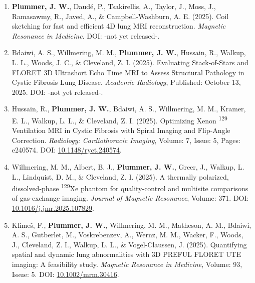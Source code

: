\documentclass[12pt,]{scrartcl}
\begin{document}
\begin{enumerate}
  \leftskip-0.13in %


    \item \textbf{Plummer, J. W.}, Daudé, P., Tsakirellis, A., Taylor, J., Moss, J., Ramasawmy, R., Javed, A., \& Campbell-Washburn, A. E. (2025). Coil sketching for fast and efficient 4D lung MRI reconstruction. \textit{Magnetic Resonance in Medicine}. DOI: -not yet released-.

    \item Bdaiwi, A. S., Willmering, M. M., \textbf{Plummer, J. W.}, Hussain, R., Walkup, L. L., Woods, J. C., \& Cleveland, Z. I. (2025). Evaluating Stack-of-Stars and FLORET 3D Ultrashort Echo Time MRI to Assess Structural Pathology in Cystic Fibrosis Lung Disease. \textit{Academic Radiology}, Published: October 13, 2025. DOI: -not yet released-.

    \item Hussain, R., \textbf{Plummer, J. W.}, Bdaiwi, A. S., Willmering, M. M., Kramer, E. L., Walkup, L. L., \& Cleveland, Z. I. (2025). Optimizing Xenon \textsuperscript{129} Ventilation MRI in Cystic Fibrosis with Spiral Imaging and Flip-Angle Correction. \textit{Radiology: Cardiothoracic Imaging}, Volume: 7, Issue: 5, Pages: e240574. DOI: \href{https://doi.org/10.1148/ryct.240574}{10.1148/ryct.240574}.



    \item Willmering, M. M., Albert, B. J., \textbf{Plummer, J. W.}, Greer, J., Walkup, L. L., Lindquist, D. M., \& Cleveland, Z. I. (2025). A thermally polarized, dissolved-phase \textsuperscript{129}Xe phantom for quality-control and multisite comparisons of gas-exchange imaging. \textit{Journal of Magnetic Resonance}, Volume: 371. DOI: \href{https://doi.org/10.1016/j.jmr.2025.107829}{10.1016/j.jmr.2025.107829}.

    \item Klimeš, F., \textbf{Plummer, J. W.}, Willmering, M. M., Matheson, A. M., Bdaiwi, A. S., Gutberlet, M., Voskrebenzev, A., Wernz, M. M., Wacker, F., Woods, J., Cleveland, Z. I., Walkup, L. L., \& Vogel-Claussen, J. (2025). Quantifying spatial and dynamic lung abnormalities with 3D PREFUL FLORET UTE imaging: A feasibility study. \textit{Magnetic Resonance in Medicine}, Volume: 93, Issue: 5. DOI: \href{https://doi.org/10.1002/mrm.30416}{10.1002/mrm.30416}.


\end{enumerate}
\end{document}

